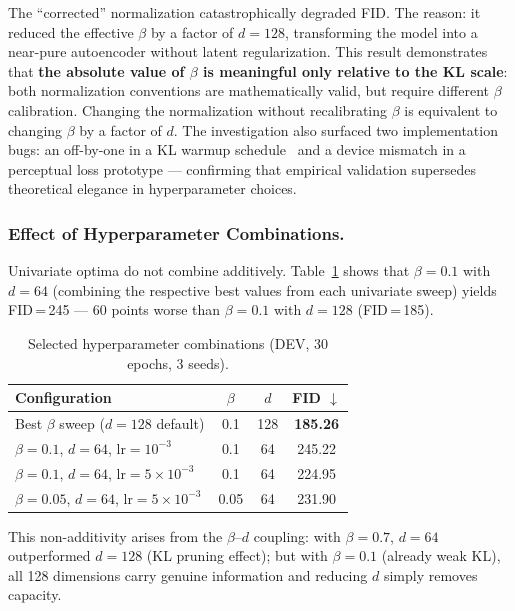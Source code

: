 \documentclass[runningheads]{llncs}
\begin{document}
The ``corrected'' normalization catastrophically degraded FID. The reason: it reduced the effective $\beta$ by a factor of $d=128$, transforming the model into a near-pure autoencoder without latent regularization. This result demonstrates that \textbf{the absolute value of $\beta$ is meaningful only relative to the KL scale}: both normalization conventions are mathematically valid, but require different $\beta$ calibration. Changing the normalization without recalibrating $\beta$ is equivalent to changing $\beta$ by a factor of $d$. The investigation also surfaced two implementation bugs: an off-by-one in a KL warmup schedule~\cite{bowman2016} and a device mismatch in a perceptual loss prototype — confirming that empirical validation supersedes theoretical elegance in hyperparameter choices.

\subsubsection{Effect of Hyperparameter Combinations.}

Univariate optima do not combine additively. Table~\ref{tab:vae_combos} shows that $\beta=0.1$ with $d=64$ (combining the respective best values from each univariate sweep) yields FID\,=\,245 — 60 points worse than $\beta=0.1$ with $d=128$ (FID\,=\,185).

\begin{table}[htbp]
\caption{Selected hyperparameter combinations (DEV, 30 epochs, 3 seeds).}\label{tab:vae_combos}
\centering
\begin{tabular}{lccc}
\toprule
Configuration & $\beta$ & $d$ & FID $\downarrow$ \\
\midrule
Best $\beta$ sweep ($d=128$ default) & 0.1  & 128 & \textbf{185.26} \\
$\beta=0.1$, $d=64$, lr$=10^{-3}$   & 0.1  & 64  & 245.22 \\
$\beta=0.1$, $d=64$, lr$=5{\times}10^{-3}$ & 0.1 & 64 & 224.95 \\
$\beta=0.05$, $d=64$, lr$=5{\times}10^{-3}$ & 0.05 & 64 & 231.90 \\
\bottomrule
\end{tabular}
\end{table}

This non-additivity arises from the $\beta$--$d$ coupling: with $\beta=0.7$, $d=64$ outperformed $d=128$ (KL pruning effect); but with $\beta=0.1$ (already weak KL), all 128 dimensions carry genuine information and reducing $d$ simply removes capacity.
\end{document}

